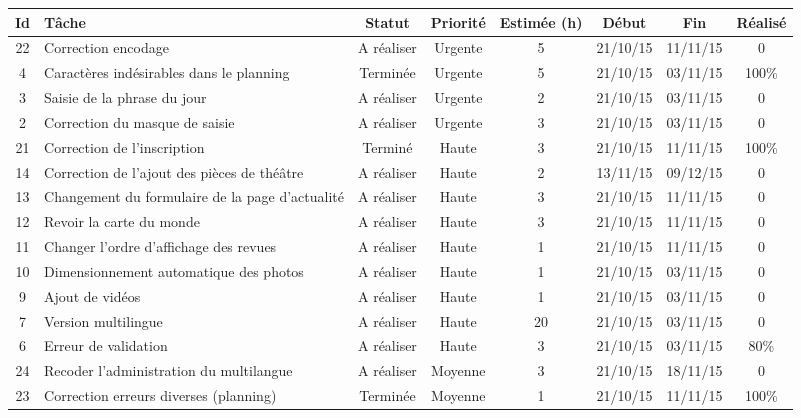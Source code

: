 \begin{tabular}{ | c | p{4cm} | c | c | c | c | c | c |   }
\hline 
Id & Tâche & Statut & Priorité & Estimée (h) & Début & Fin & Réalisé \\ \hline


22 & Correction encodage & A réaliser & Urgente & 5 & 21/10/15 & 11/11/15 & 0
	  \\ \hline
4 & Caractères indésirables dans le planning & Terminée & Urgente & 5 & 21/10/15
	& 03/11/15 & 100\%  \\ \hline
3 & Saisie de la phrase du jour & A réaliser & Urgente & 2 & 21/10/15 & 03/11/15
	& 0  \\ \hline
2 & Correction du masque de saisie & A réaliser & Urgente & 3 & 21/10/15 &
	03/11/15 & 0  \\ \hline
	
21 & Correction de l'inscription & Terminé & Haute & 3 & 21/10/15 &
	11/11/15 & 100\%  \\ \hline
14 & Correction de l'ajout des pièces de théâtre & A réaliser & Haute & 2 &
	13/11/15 & 09/12/15 & 0 \\ \hline
13 & Changement du formulaire de la page d'actualité & A réaliser & Haute & 3 &
	21/10/15 & 11/11/15 & 0  \\ \hline
12 & Revoir la carte du monde & A réaliser & Haute & 3 & 21/10/15 & 11/11/15 & 0
	 \\ \hline
11 & Changer l'ordre d'affichage des revues & A réaliser & Haute & 1 & 21/10/15
	& 11/11/15 & 0  \\ \hline
10 & Dimensionnement automatique des photos & A réaliser & Haute & 1 & 21/10/15
	& 03/11/15 & 0  \\ \hline
9 & Ajout de vidéos & A réaliser & Haute & 1 & 21/10/15 & 03/11/15 & 0  \\
\hline
7 & Version multilingue & A réaliser & Haute & 20 & 21/10/15 & 03/11/15 & 0  \\
\hline
6 & Erreur de validation & A réaliser & Haute & 3 & 21/10/15 & 03/11/15 & 80\% 
\\
\hline


24 & Recoder l'administration du multilangue & A réaliser & Moyenne & 3 &
	21/10/15 & 18/11/15 & 0  \\ \hline
23 & Correction erreurs diverses (planning)
	& Terminée & Moyenne & 1 & 21/10/15 & 11/11/15 & 100\%  \\ \hline
	

\end{tabular}
